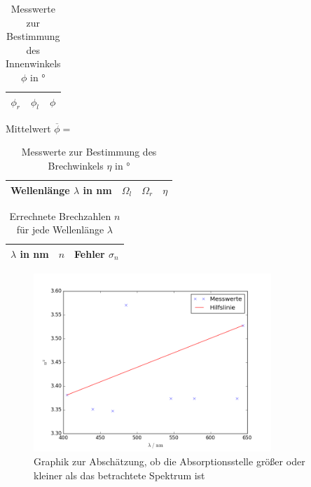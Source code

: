 \begin{table}[h!]
	\centering	
	\begin{tabular}{c|c|c}
		$\phi_r$ & $\phi_l$ & $\phi$ \\
		\hline
		
	\end{tabular}
	\caption{Messwerte zur Bestimmung des Innenwinkels $\phi$ in \si{\degree}}
	\label{tab:WinkelPhi}
\end{table}
Mittelwert $\overline{\phi} = $

\begin{table}[h!]
	\centering	
	\begin{tabular}{c|c|c|c}
		Wellenlänge $\lambda$ in \si{\nano\meter} & $\Omega_l$ & $\Omega_r$ & $\eta$ \\
		\hline
		
	\end{tabular}
	\caption{Messwerte zur Bestimmung des Brechwinkels $\eta$ in \si{\degree}}
	\label{tab:WinkelFarben}
\end{table}

\begin{table}[h!]
	\centering	
	\begin{tabular}{c|c|c}
		$\lambda$ in \si{\nano\meter} & $n$ & Fehler $\sigma_n$ \\
		\hline
		
	\end{tabular}
	\caption{Errechnete Brechzahlen $n$ für jede Wellenlänge $\lambda$}
	\label{tab:Brechzahl}
\end{table}

\begin{figure}
	\centering
	\includegraphics[width=0.8\textwidth]{Tendenz.png}
	\caption{Graphik zur Abschätzung, ob die Absorptionsstelle größer oder kleiner als das betrachtete Spektrum ist}
\end{figure}

